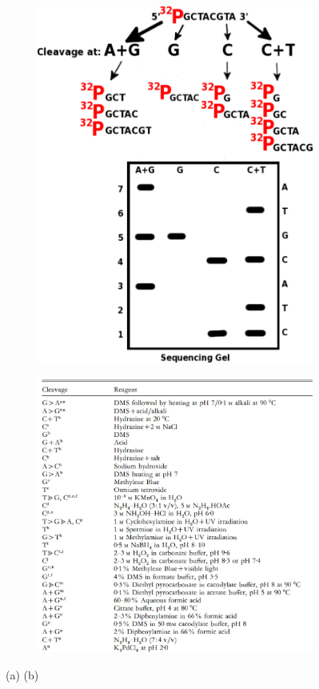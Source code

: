 \documentclass{report}\usepackage[]{graphicx}\usepackage[]{color}
\begin{document}
\begin{figure}[h]
\centering
  \begin{subfigure}[b]{.5\linewidth}
    \centering
    \includegraphics[width=.7\textwidth]{images/MG_2.pdf}
    \caption{}\label{fig:MGpro}
  \end{subfigure}%
  \hfill
  \begin{subfigure}[b]{.5\linewidth}
    \centering
    \includegraphics[width=.99\textwidth]{images/MG_Chem.pdf}
    \caption{}\label{fig:MGchem}
  \end{subfigure}%
  \caption{(a)   (b) }\label{fig:MG}
\end{figure}
\end{document}
